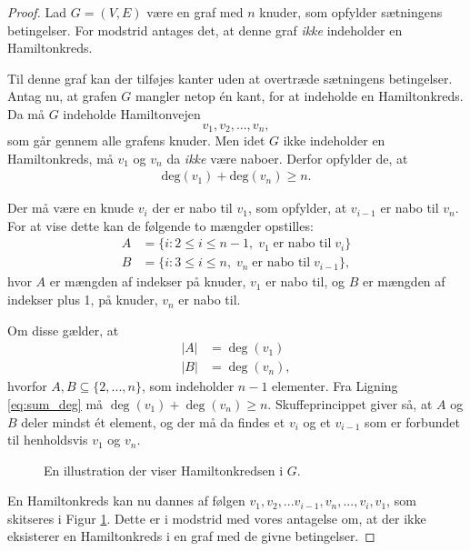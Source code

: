 \begin{proof}
	Lad $G=(V,E)$ være en graf med $n$ knuder, som opfylder sætningens betingelser. For modstrid antages det, at denne graf \textit{ikke} indeholder en Hamiltonkreds.

	Til denne graf kan der tilføjes kanter uden at overtræde sætningens betingelser. Antag nu, at grafen $G$ mangler netop én kant, for at indeholde en Hamiltonkreds. 
	Da må $G$ indeholde Hamiltonvejen 
	$$v_1, v_2,...,v_n,$$
	som går gennem alle grafens knuder. 
	Men idet $G$ ikke indeholder en Hamiltonkreds, må $v_1$ og $v_n$ da \textit{ikke} være naboer.
	Derfor opfylder de, at
	\begin{align} \label{eq:sum_deg}
		\textrm{deg}(v_1)+\textrm{deg}(v_n)\geq n.
	\end{align}

	Der må være en knude $v_i$ der er nabo til $v_1$, som opfylder, at $v_{i-1}$ er nabo til $v_n$.
	For at vise dette kan de følgende to mængder opstilles:
	\begin{align*}
		A &= \lbrace i: 2 \leq i \leq n-1, \; v_1 \; \textrm{er nabo til} \; v_i \rbrace \\
		B &= \lbrace i: 3 \leq i \leq n, \; v_n \; \textrm{er nabo til} \; v_{i-1} \rbrace,
	\end{align*}
	hvor $A$ er mængden af indekser på knuder, $v_1$ er nabo til, og $B$ er mængden af indekser plus 1, på knuder, $v_n$ er nabo til. 

	Om disse gælder, at
	\begin{align*}
		|A| &= \deg(v_1) \\
		|B| &= \deg(v_n),
	\end{align*}
	hvorfor $A,B \subseteq \lbrace 2,...,n \rbrace$, som indeholder $n-1$ elementer.
	Fra Ligning \eqref{eq:sum_deg} må $\deg(v_1) + \deg(v_n) \geq n$.
	Skuffeprincippet giver så, at $A$ og $B$ deler mindst ét element, og der må da findes et $v_i$ og et $v_{i-1}$ som er forbundet til henholdsvis $v_1$ og $v_n$.

	\begin{figure}[h!]
		\centering
		
		\caption{En illustration der viser Hamiltonkredsen i $G$.} \label{ore_bevis}
	\end{figure}
	
	En Hamiltonkreds kan nu dannes af følgen $v_1, v_2,...v_{i-1},v_n,...,v_i,v_1$,
	som skitseres i Figur \ref{ore_bevis}. Dette er i modstrid med vores antagelse om, at der ikke eksisterer en Hamiltonkreds i en graf med de givne betingelser.	
\end{proof}

